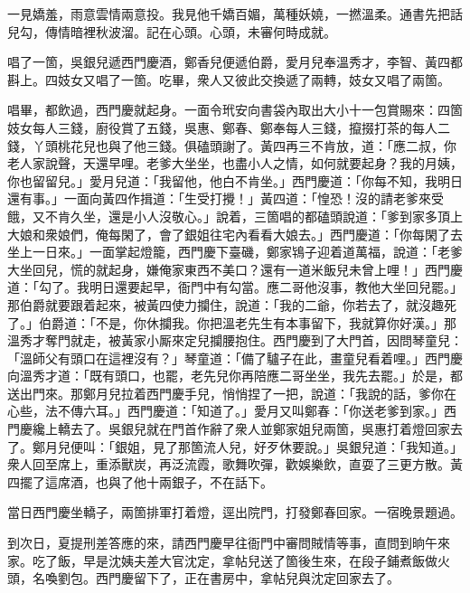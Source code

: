 \begin{myquote} 
一見嬌羞，雨意雲情兩意投。我見他千嬌百媚，萬種妖嬈，一撚溫柔。通書先把話兒勾，傳情暗裡秋波溜。記在心頭。心頭，未審何時成就。
\end{myquote} 

唱了一箇，吳銀兒遞西門慶酒，鄭香兒便遞伯爵，愛月兒奉溫秀才，李智、黃四都斟上。四妓女又唱了一箇。吃畢，衆人又彼此交換遞了兩轉，妓女又唱了兩箇。

唱畢，都飲過，西門慶就起身。一面令玳安向書袋內取出大小十一包賞賜來：四箇妓女每人三錢，廚役賞了五錢，吳惠、鄭春、鄭奉每人三錢，攛掇打茶的每人二錢，丫頭桃花兒也與了他三錢。俱磕頭謝了。黃四再三不肯放，道：「應二叔，你老人家說聲，天還早哩。老爹大坐坐，也盡小人之情，如何就要起身？我的月姨，你也留留兒。」愛月兒道：「我留他，他白不肯坐。」西門慶道：「你每不知，我明日還有事。」一面向黃四作揖道：「生受打攪！」黃四道：「惶恐！沒的請老爹來受餓，又不肯久坐，還是小人沒敬心。」說着，三箇唱的都磕頭說道：「爹到家多頂上大娘和衆娘們，俺每閑了，會了銀姐往宅內看看大娘去。」西門慶道：「你每閑了去坐上一日來。」一面掌起燈籠，西門慶下臺磯，鄭家鴇子迎着道萬福，說道：「老爹大坐回兒，慌的就起身，嫌俺家東西不美口？還有一道米飯兒未曾上哩！」西門慶道：「勾了。我明日還要起早，衙門中有勾當。應二哥他沒事，教他大坐回兒罷。」那伯爵就要跟着起來，被黃四使力攔住，說道：「我的二爺，你若去了，就沒趣死了。」伯爵道：「不是，你休攔我。你把溫老先生有本事留下，我就算你好漢。」那溫秀才奪門就走，被黃家小厮來定兒攔腰抱住。{}西門慶到了大門首，因問琴童兒：「溫師父有頭口在這裡沒有？」琴童道：「備了驢子在此，畫童兒看着哩。」西門慶向溫秀才道：「既有頭口，也罷，老先兒你再陪應二哥坐坐，我先去罷。」於是，都送出門來。那鄭月兒拉着西門慶手兒，悄悄捏了一把，{}說道：「我說的話，爹你在心些，法不傳六耳。」西門慶道：「知道了。」愛月又叫鄭春：「你送老爹到家。」西門慶纔上轎去了。吳銀兒就在門首作辭了衆人並鄭家姐兒兩箇，吳惠打着燈回家去了。鄭月兒便叫：「銀姐，見了那箇流人兒，{}好歹休要說。」吳銀兒道：「我知道。」衆人回至席上，重添獸炭，再泛流霞，歌舞吹彈，歡娛樂飲，直耍了三更方散。黃四擺了這席酒，也與了他十兩銀子，不在話下。

當日西門慶坐轎子，兩箇排軍打着燈，逕出院門，打發鄭春回家。一宿晚景題過。

到次日，夏提刑差答應的來，請西門慶早往衙門中審問賊情等事，直問到晌午來家。吃了飯，早是沈姨夫差大官沈定，拿帖兒送了箇後生來，在段子鋪煮飯做火頭，名喚劉包。西門慶留下了，正在書房中，拿帖兒與沈定回家去了。

